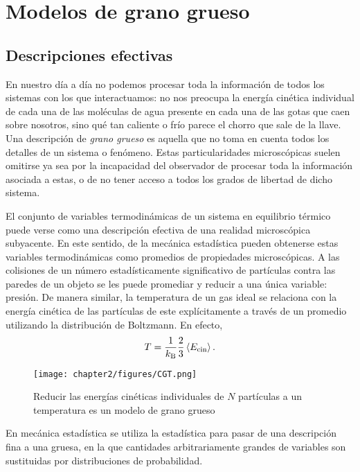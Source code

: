 \section{Modelos de grano grueso}
\label{sec:ch2_cg}

\subsection{Descripciones efectivas}



En nuestro día a día no podemos procesar toda la información de todos los sistemas con los que interactuamos: no nos preocupa la energía cinética individual de cada una de las moléculas de agua presente en cada una de las gotas que caen sobre nosotros, sino qué tan caliente o frío parece el chorro que sale de la llave. Una descripción de \textit{grano grueso} es aquella que no toma en cuenta todos los detalles de un sistema o fenómeno. Estas particularidades microscópicas suelen omitirse ya sea por la incapacidad del observador de procesar toda la información asociada a estas, o de no tener acceso a todos los grados de libertad de dicho sistema.

El conjunto de variables termodinámicas de un sistema en equilibrio térmico puede verse como una descripción efectiva de una realidad microscópica subyacente. En este sentido, de la mecánica estadística pueden obtenerse estas variables termodinámicas como promedios de propiedades microscópicas. A las colisiones de un número estadísticamente significativo de partículas contra las paredes de un objeto se les puede promediar y reducir a una única variable: presión. De manera similar, la temperatura de un gas ideal se relaciona con la energía cinética de las partículas de este explícitamente a través de un promedio utilizando la distribución de Boltzmann. En efecto, 
\begin{equation}
    T=\frac{1}{k_\text{B}}\frac{2}{3}\expval{E_{\text{cin}}}.\nonumber
\end{equation}
\begin{figure}[ht]
    \centering
    \texttt{[image: chapter2/figures/CGT.png]}
    \caption{Reducir las energías cinéticas individuales de $N$ partículas a un temperatura es un modelo de grano grueso}
    \label{fig:ch2_KtoT}
\end{figure}

En mecánica estadística se utiliza la estadística para pasar de una descripción fina a una gruesa, en la que cantidades arbitrariamente grandes de variables son sustituidas por distribuciones de probabilidad.

